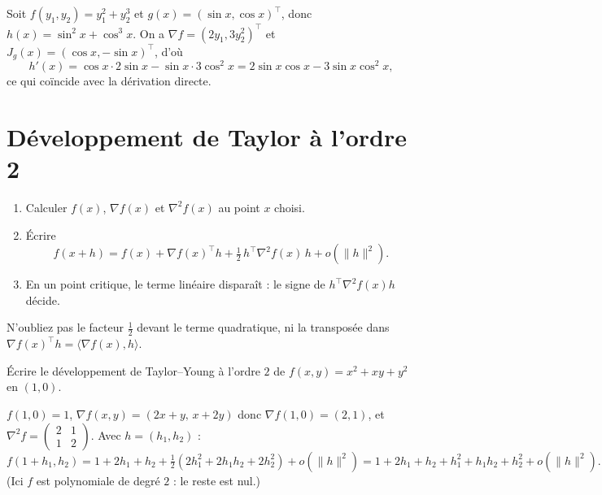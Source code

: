 \begin{exemple}
Soit $f(y_1,y_2)=y_1^2+y_2^3$ et $g(x)=(\sin x,\cos x)^{\top}$, donc $h(x)=\sin^2x+\cos^3x$. On a $\nabla f=(2y_1,3y_2^2)^{\top}$ et $J_g(x)=(\cos x,-\sin x)^{\top}$, d'où
\[
  h'(x)=\cos x\cdot2\sin x-\sin x\cdot3\cos^2x=2\sin x\cos x-3\sin x\cos^2x,
\]
ce qui coïncide avec la dérivation directe.
\end{exemple}

\section{Développement de Taylor à l'ordre 2}

\begin{methode}
\begin{enumerate}[label=\textbf{Étape \arabic*.}]
  \item Calculer $f(x)$, $\nabla f(x)$ et $\nabla^2f(x)$ au point $x$ choisi.
  \item Écrire
  \[
    f(x+h)=f(x)+\nabla f(x)^{\top}h+\tfrac12\,h^{\top}\nabla^2f(x)\,h+o(\|h\|^2).
  \]
  \item En un point critique, le terme linéaire disparaît : le signe de $h^{\top}\nabla^2f(x)h$ décide.
\end{enumerate}
\end{methode}

\begin{attention}
N'oubliez pas le facteur $\frac12$ devant le terme quadratique, ni la transposée dans $\nabla f(x)^{\top}h=\langle\nabla f(x),h\rangle$.
\end{attention}

\begin{exercice}[Application]
Écrire le développement de Taylor--Young à l'ordre $2$ de $f(x,y)=x^2+xy+y^2$ en $(1,0)$.
\begin{correction}
$f(1,0)=1$, $\nabla f(x,y)=(2x+y,\,x+2y)$ donc $\nabla f(1,0)=(2,1)$, et $\nabla^2f=\begin{pmatrix}2&1\\1&2\end{pmatrix}$. Avec $h=(h_1,h_2)$ :
\[
  f(1+h_1,h_2)=1+2h_1+h_2+\tfrac12\left(2h_1^2+2h_1h_2+2h_2^2\right)+o(\|h\|^2)=1+2h_1+h_2+h_1^2+h_1h_2+h_2^2+o(\|h\|^2).
\]
(Ici $f$ est polynomiale de degré $2$ : le reste est nul.)
\end{correction}
\end{exercice}
